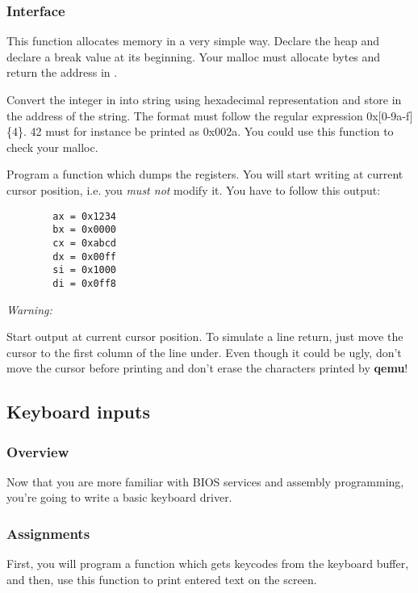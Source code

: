\subsubsection*{Interface}
{
  This function allocates memory in a very simple way. Declare the heap and
  declare a break value at its beginning.
  Your malloc must allocate  bytes and return the address
  in .
}

{
  Convert the integer in  into string using hexadecimal
  representation and store in  the address of the string.
  The format must follow the regular expression 0x[0-9a-f]\{4\}.
  42 must for instance be printed as 0x002a. You could use this function
  to check your malloc.
}

{
  Program a function which dumps the registers. You will start writing
  at current cursor position, i.e. you \emph{must not} modify it. You have to
  follow this output:
}
\begin{verbatim}
        ax = 0x1234
        bx = 0x0000
        cx = 0xabcd
        dx = 0x00ff
        si = 0x1000
        di = 0x0ff8
\end{verbatim}

\command{}
{
  {\em Warning:}

  Start output at current cursor position. To simulate a line return, just move
  the cursor to the first column of the line under. Even though it could be
  ugly, don't move the cursor before printing and don't erase the characters
  printed by \textbf{qemu}!
}

%
%

\newpage

\subsection{Keyboard inputs}

\subsubsection*{Overview}
Now that you are more familiar with BIOS services and assembly programming,
you're going to write a basic keyboard driver.

\subsubsection*{Assignments}
First, you will program a function which gets keycodes from the keyboard
buffer, and then, use this function to print entered text on the screen.

